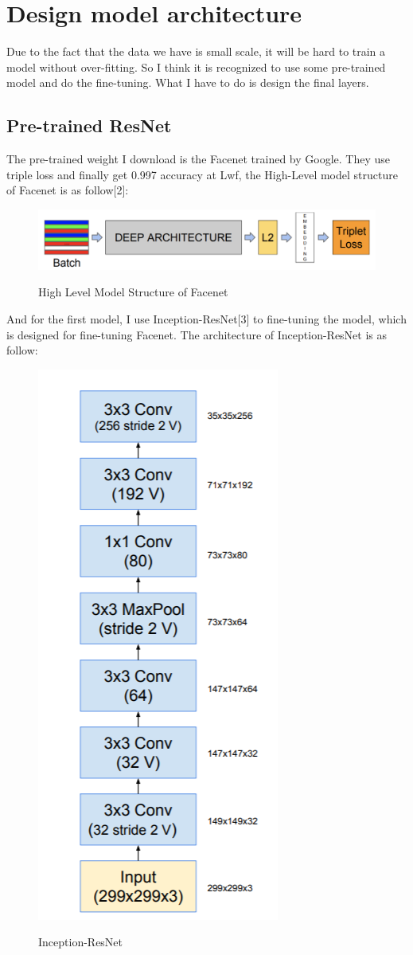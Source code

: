 \documentclass{article}
\begin{document}
\section{Design model architecture}
Due to the fact that the data we have is small scale, it will be hard to train a model without over-fitting. So I think it is recognized to use some pre-trained model and do the fine-tuning.  What I have to do is design the final layers.

\subsection{Pre-trained ResNet}
The pre-trained weight I download is the Facenet trained by Google. They use triple loss and finally get 0.997 accuracy at Lwf, the High-Level model structure of Facenet is as follow[2]:
\begin{figure}[H]%
  \centering
  \caption{High Level Model Structure of Facenet}
  \includegraphics[width=\columnwidth]{IMG/facenet.png} %
  \label{Fig.RNN} %
\end{figure}
And for the first model, I use Inception-ResNet[3] to fine-tuning the model, which is designed for fine-tuning Facenet. The architecture of Inception-ResNet is as follow:
\begin{figure}[H]%
  \centering
  \caption{Inception-ResNet}
  \includegraphics[width=18ex]{IMG/RESNET.png} %
  \label{Fig.RNN} %
\end{figure}
\end{document}
